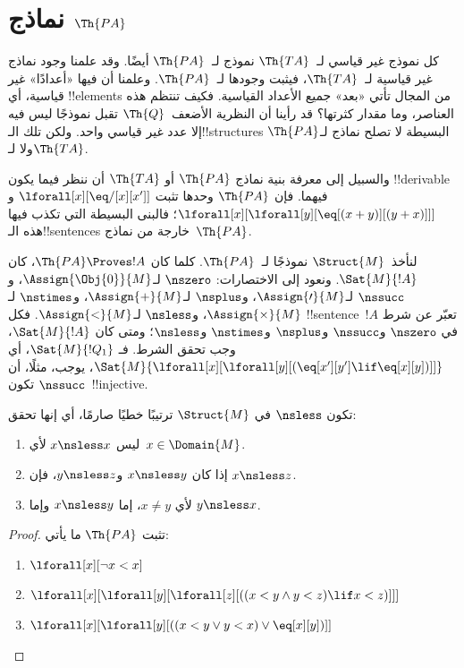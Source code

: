 \documentclass[../../../include/open-logic-section]{subfiles}
\begin{document}
\section{نماذج $\Th{PA}$}

\begin{explain}
كل نموذج غير قياسي لـ~$\Th{TA}$ نموذج لـ~$\Th{PA}$ أيضًا.
وقد علمنا وجود نماذج غير قياسية لـ~$\Th{TA}$، فيثبت وجودها
لـ~$\Th{PA}$. وعلمنا أن فيها «أعدادًا» غير قياسية، أي
!!{element}s من المجال تأتي «بعد» جميع الأعداد القياسية.
فكيف تنتظم هذه العناصر، وما مقدار كثرتها؟ قد رأينا أن
النظرية الأضعف~$\Th{Q}$ تقبل نموذجًا ليس فيه إلا عدد غير
قياسي واحد. ولكن تلك الـ!!{structure}s البسيطة لا تصلح
نماذج لـ$\Th{PA}$ ولا لـ$\Th{TA}$.

والسبيل إلى معرفة بنية نماذج $\Th{PA}$ أو $\Th{TA}$ أن ننظر
فيما يكون !!{derivable} فيهما. فإن $\Th{PA}$ وحدها تثبت
$\lforall[x][\eq/[x][x']]$ و
$\lforall[x][\lforall[y][\eq[(x+y)][(y+x)]]]$؛ فالبنى البسيطة
التي تكذب فيها هذه الـ!!{sentence}s خارجة من نماذج~$\Th{PA}$.

لنأخذ~$\Struct{M}$ نموذجًا لـ~$\Th{PA}$. كلما كان
$\Th{PA} \Proves !A$، كان $\Sat{M}{!A}$.
ونعود إلى الاختصارات: $\nszero$ لـ$\Assign{\Obj{0}}{M}$،
و$\nssucc$ لـ$\Assign{\prime}{M}$، و$\nsplus$ لـ$\Assign{+}{M}$،
و$\nstimes$ لـ$\Assign{\times}{M}$، و$\nsless$ لـ$\Assign{<}{M}$.
فكل !!{sentence}~$!A$ تعبّر عن شرط في
$\nszero$ و$\nssucc$ و$\nsplus$ و$\nstimes$ و$\nsless$؛
ومتى كان $\Sat{M}{!A}$، وجب تحقق الشرط.
فـ $\Sat{M}{!Q_1}$، أي
$\Sat{M}{\lforall[x][\lforall[y][(\eq[x'][y'] \lif \eq[x][y])]]}$،
يوجب، مثلًا، أن تكون $\nssucc$~!!{injective}.
\end{explain}

\begin{prop}
تكون $\nsless$ في $\Struct{M}$ ترتيبًا خطيًا صارمًا، أي إنها تحقق:
\begin{enumerate}
\item ليس $x \nsless x$ لأي~$x \in \Domain{M}$.
\item إذا كان $x \nsless y$ و$y \nsless z$، فإن $x \nsless z$.
\item لأي $x \neq y$، إما $x \nsless y$ وإما $y \nsless x$.
\end{enumerate}
\end{prop}

\begin{proof}
تثبت $\Th{PA}$ ما يأتي:
\begin{enumerate}
\item $\lforall[x][\lnot x < x]$
\item $\lforall[x][\lforall[y][\lforall[z][((x < y \land y < z) \lif x < z)]]]$
\item $\lforall[x][\lforall[y][((x < y \lor y < x) \lor \eq[x][y])]]$
\end{enumerate}
\end{proof}
\end{document}
